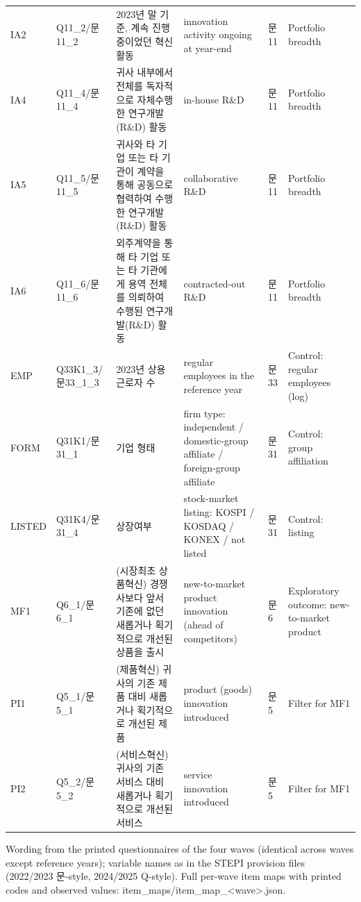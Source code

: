 \documentclass[varwidth=\maxdimen,border=4pt]{standalone}
\begin{document}
{\begin{tabular}{l l p{5.2cm} p{4.2cm} l p{3.6cm}}
IA2 & Q11\_2/문11\_2 & 2023년 말 기준, 계속 진행 중이었던 혁신활동 & innovation activity ongoing at year-end & 문11 & Portfolio breadth \\
IA4 & Q11\_4/문11\_4 & 귀사 내부에서 전체를 독자적으로 자체수행한 연구개발(R\&D) 활동 & in-house R\&D & 문11 & Portfolio breadth \\
IA5 & Q11\_5/문11\_5 & 귀사와 타 기업 또는 타 기관이 계약을 통해 공동으로 협력하여 수행한 연구개발(R\&D) 활동 & collaborative R\&D & 문11 & Portfolio breadth \\
IA6 & Q11\_6/문11\_6 & 외주계약을 통해 타 기업 또는 타 기관에게 용역 전체를 의뢰하여 수행된 연구개발(R\&D) 활동 & contracted-out R\&D & 문11 & Portfolio breadth \\
EMP & Q33K1\_3/문33\_1\_3 & 2023년 상용 근로자 수 & regular employees in the reference year & 문33 & Control: regular employees (log) \\
FORM & Q31K1/문31\_1 & 기업 형태 & firm type: independent / domestic-group affiliate / foreign-group affiliate & 문31 & Control: group affiliation \\
LISTED & Q31K4/문31\_4 & 상장여부 & stock-market listing: KOSPI / KOSDAQ / KONEX / not listed & 문31 & Control: listing \\
MF1 & Q6\_1/문6\_1 & (시장최초 상품혁신) 경쟁사보다 앞서 기존에 없던 새롭거나 획기적으로 개선된 상품을 출시 & new-to-market product innovation (ahead of competitors) & 문6 & Exploratory outcome: new-to-market product \\
PI1 & Q5\_1/문5\_1 & (제품혁신) 귀사의 기존 제품 대비 새롭거나 획기적으로 개선된 제품 & product (goods) innovation introduced & 문5 & Filter for MF1 \\
PI2 & Q5\_2/문5\_2 & (서비스혁신) 귀사의 기존 서비스 대비 새롭거나 획기적으로 개선된 서비스 & service innovation introduced & 문5 & Filter for MF1 \\
\bottomrule
\end{tabular}}
\usebox{\tb}
\par\vspace{3pt}\parbox{\wd\tb}{\footnotesize Wording from the printed questionnaires of the four waves (identical across waves except reference years); variable names as in the STEPI provision files (2022/2023 문-style, 2024/2025 Q-style). Full per-wave item maps with printed codes and observed values: item\_maps/item\_map\_<wave>.json.}
\end{document}
